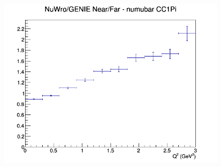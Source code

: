 \begin{figure}[h]
\endminipage
{}
\includegraphics[width=\linewidth]{eff_Q2/GAr/ratios/CC1Pi_NuWro_GENIE_numubar_NF_Q2.png}
\endminipage
\newline
\end{figure}
\clearpage
